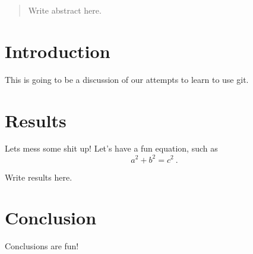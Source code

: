 \documentclass{article}
\begin{document}
\begin{abstract}
Write abstract here.
\end{abstract}

\section{Introduction}

This is going to be a discussion of our attempts to learn to use git.

\section{Results}

Lets mess some shit up!
Let's have a fun equation, such as
\begin{equation}
a^2 + b^2 = c^2~.
\end{equation}

Write results here.

\section{Conclusion}

Conclusions are fun!
\end{document}
